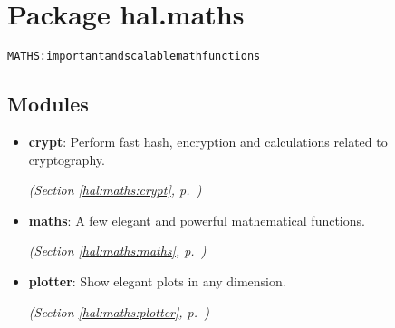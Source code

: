 %
%
%


\section{Package hal.maths}

    \label{hal:maths}
\begin{alltt}
MATHS: important and scalable math functions 
\end{alltt}



\subsection{Modules}

\begin{itemize}
\setlength{\parskip}{0ex}
\item \textbf{crypt}: Perform fast hash, encryption and calculations related to cryptography. 


  \textit{(Section \ref{hal:maths:crypt}, p.~\pageref{hal:maths:crypt})}

\item \textbf{maths}: A few elegant and powerful mathematical functions. 


  \textit{(Section \ref{hal:maths:maths}, p.~\pageref{hal:maths:maths})}

\item \textbf{plotter}: Show elegant plots in any dimension. 


  \textit{(Section \ref{hal:maths:plotter}, p.~\pageref{hal:maths:plotter})}

\end{itemize}



